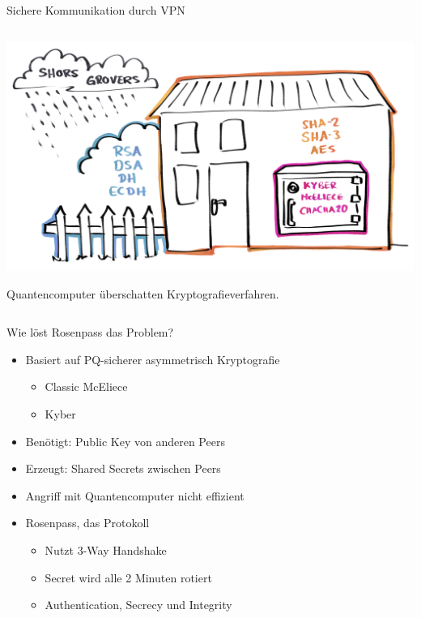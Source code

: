 \documentclass{rosenpass-beamer}
\newcommand*{\imgNote}[1]{\begin{center}\setlength{\parskip}{0pt}\tiny\raggedright#1\end{center}}
\begin{document}
\begin{frame}{Sichere Kommunikation durch VPN}
\begin{columns}[T]
\begin{column}{0.4\textwidth}
\includegraphics[width=\textwidth]{graphics/qc and crypto.png}

\imgNote{Quantencomputer überschatten Kryptografieverfahren.}

\end{column}
\end{columns}
\end{frame}

\begin{frame}{Wie löst Rosenpass das Problem?}
\begin{itemize}
\item  Basiert auf PQ-sicherer asymmetrisch Kryptografie

  \begin{itemize}
  \item Classic McEliece
  \item Kyber
  \end{itemize}
\item  Benötigt: Public Key von anderen Peers
\item  Erzeugt: Shared Secrets zwischen Peers
\item  Angriff mit Quantencomputer nicht effizient
\item  Rosenpass, das Protokoll

  \begin{itemize}
    \item Nutzt 3-Way Handshake
  \item Secret wird alle 2 Minuten rotiert
  \item Authentication, Secrecy und Integrity
  \end{itemize}
\end{itemize}
\end{frame}
\end{document}
